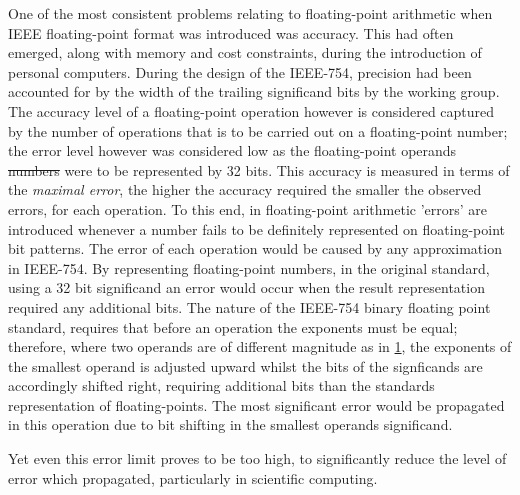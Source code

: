 \documentclass[7pt]{article}
\begin{document}
One of the most consistent problems relating to floating-point arithmetic when IEEE floating-point format was introduced was accuracy. This had often emerged, along with memory and cost constraints, during the introduction of personal computers. During the design of the IEEE-754, precision had been accounted for by the width of the trailing significand bits by the working group. The accuracy level of a floating-point operation however is considered captured by the number of operations that is to be carried out on a floating-point number; the error level however was considered low as the floating-point operands \st{numbers} were to be represented by 32 bits. This accuracy is measured in terms of the \textit{maximal error}, the higher the accuracy required the smaller the observed errors, for each operation. To this end, in floating-point arithmetic  'errors' are introduced whenever a number fails to be definitely represented on floating-point bit patterns. The error of each operation would be caused by any approximation in IEEE-754. By representing floating-point numbers, in the original standard, using a 32 bit significand an error would occur when the result representation required any additional bits. The nature of the IEEE-754 binary floating point standard, requires that before an operation the exponents must be equal; therefore, where two operands are of different magnitude as in \ref{right-hand-calc}, the exponents of the smallest operand is adjusted upward whilst the bits of the signficands are accordingly shifted right, requiring additional bits than the standards representation of floating-points. The most significant error would be propagated in this operation due to bit shifting in the smallest operands significand.

Yet even this error limit proves to be too high, to significantly reduce the level of error which propagated, particularly in scientific computing.


\begin{figure}
\label{right-hand-calc}	
\end{figure} 

 



 
\end{document}
